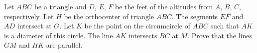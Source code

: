 Let $ABC$ be a triangle and $D$, $E$, $F$ be the feet of the altitudes from $A$, $B$, $C$, respectively.
Let $H$ be the orthocenter of triangle $ABC$.
The segments $EF$ and $AD$ intersect at $G$.
Let $K$ be the point on the circumcircle of $ABC$ such that $AK$ is a diameter of this circle.
The line $AK$ intersects $BC$ at $M$.
Prove that the lines $GM$ and $HK$ are parallel.
